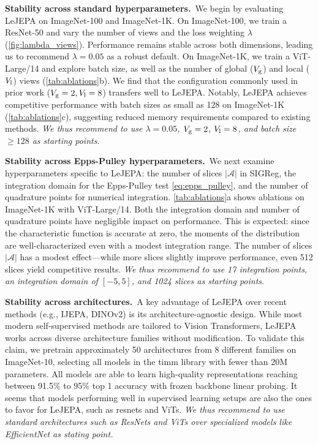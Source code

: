 {\bf Stability across standard hyperparameters.}~We begin by evaluating LeJEPA 
on ImageNet-100 and ImageNet-1K. On ImageNet-100, we train a ResNet-50 and 
vary the number of views and the loss weighting $\lambda$ (\cref{fig:lambda_views}). 
Performance remains stable across both dimensions, leading us to recommend 
$\lambda=0.05$ as a robust default.
On ImageNet-1K, we train a ViT-Large/14 and explore batch size, as well as 
the number of global ($V_{\rm g}$) and local ($V_{\rm l}$) views 
(\cref{tab:ablations}b). We find that the configuration commonly used in 
prior work ($V_{\rm g}=2, V_{\rm l}=8$) transfers well to LeJEPA. Notably, 
LeJEPA achieves competitive performance with batch sizes as small as 128 
on ImageNet-1K (\cref{tab:ablations}c), suggesting reduced memory requirements compared to existing 
methods. {\em We thus recommend to use  $\lambda=0.05$, $V_{\rm g}=2$, $V_{\rm l}=8$, and 
batch size $\geq 128$ as starting points}.


{\bf Stability across Epps-Pulley hyperparameters.}~We next examine 
hyperparameters specific to LeJEPA: the number of slices $|\mathcal{A}|$ 
in SIGReg, the integration domain for the Epps-Pulley test \eqref{eq:epps_pulley}, and the number of quadrature points for numerical integration. 
\cref{tab:ablations}a shows ablations on ImageNet-1K with ViT-Large/14.
Both the integration domain and number of quadrature points have negligible 
impact on performance. This is expected: since the characteristic function 
is accurate at zero, the moments of the distribution are well-characterized 
even with a modest integration range. The number of slices $|\mathcal{A}|$ 
has a modest effect—while more slices slightly improve performance, even 
512 slices yield competitive results. {\em We thus recommend to use 17 integration points, an integration domain of 
$[-5,5]$, and 1024 slices as starting points}.


{\bf Stability across architectures.}~A key advantage of LeJEPA over recent 
methods (e.g., IJEPA, DINOv2) is its architecture-agnostic design. While 
most modern self-supervised methods are tailored to Vision Transformers, 
LeJEPA works across diverse architecture families without modification.
To validate this claim, we pretrain approximately 50 architectures from 
8 different families on ImageNet-10, selecting all models in the timm 
library with fewer than 20M parameters. All models are able to learn high-quality representations reaching between 91.5\% to 95\% top 1 accuracy with frozen backbone linear probing. It seems that models performing well in supervised learning setups are also the ones to favor for LeJEPA, such as resnets and ViTs. {\em We thus recommend to use standard architectures such as ResNets and ViTs over specialized models like EfficientNet as stating point.}






